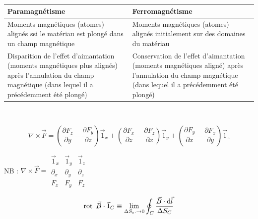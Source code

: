 \documentclass	[11pt, a4paper, openany]{book}
\begin{document}
\\\\
\renewcommand{\arraystretch}{1.8}
\begin{tabular}{|p{7.55cm}|p{7.55cm}|}
\hline
 Paramagnétisme & Ferromagnétisme \\
 \hline
 Moments magnétiques (atomes) alignés  ssi le matériau est plongé dans un champ magnétique &  Moments magnétiques (atomes) alignés initialement sur des domaines du matériau\\
 \hline
 Disparition de l'effet d'aimantation (moments magnétiques plus alignés) après l'annulation du champ magnétique (dans lequel il a précédemment été  plongé) &  Conservation de l'effet d'aimantation (moments magnétiques aligné) après l'annulation du champ magnétique (dans lequel il a précédemment été  plongé) \\
 \hline
\end{tabular}\\


$$ \nabla \times \vec F = \left(\frac{\partial F_z}{\partial y} - \frac{\partial F_y}{\partial z}\right)\vec 1_x + \left(\frac{\partial F_x}{\partial z} - \frac{\partial F_z}{\partial x}\right)\vec 1_y + \left(\frac{\partial F_y}{\partial x} - \frac{\partial F_x}{\partial y}\right)\vec 1_z $$

NB : $ \nabla \times \vec F = \begin{array}{|ccc|}
\vec 1_x & \vec 1_y & \vec  1_z \\ 
\partial_x & \partial_y & \partial_z \\ 
F_x & F_y & F_z
\end{array} $


$$ \rot\ \vec B \cdot \vec 1_C \equiv \lim_{\Delta S_c. \rightarrow 0} \oint_{C} \dfrac{\vec B \cdot {\rm d}\vec l}{\Delta S_C} $$

\end{document}
